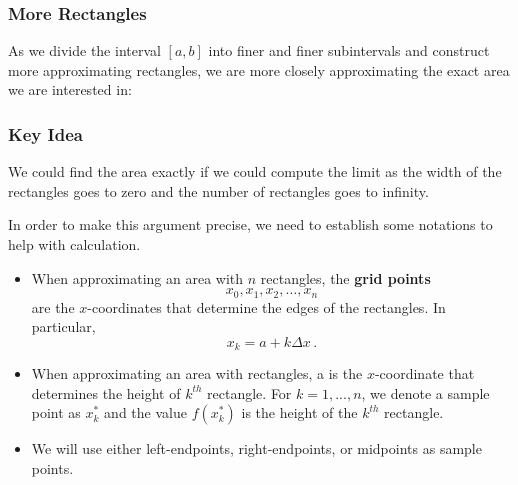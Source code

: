 \documentclass[10pt,t,handout,ignorenonframetext,aspectratio=169]{beamer}
\begin{document}
\begin{frame}
  \frametitle{More Rectangles}

  As we divide the interval $[a,b]$ into finer and finer subintervals
  and construct more approximating rectangles, we are more closely
  approximating the exact area we are interested in:

  \begin{image}
  \end{image}
\end{frame}


\begin{frame}
  \frametitle{Key Idea}
  We could find the area exactly if we could compute the
  limit as the width of the rectangles goes to zero and the number of
  rectangles goes to infinity.

  In order to make this argument precise, we need to establish some
  notations to help with calculation.

  \begin{itemize}
  \item When approximating an area with $n$ rectangles, the \textbf{grid points}
    \[
      x_0, x_1, x_2, \ldots, x_n
    \]
    are the $x$-coordinates that determine the edges of the
    rectangles. In particular,
    \[
      x_k = a + k \Delta x \,.
    \]
  \item When approximating an area with rectangles, a  is
    the $x$-coordinate that determines the height of $k^{th}$
    rectangle. For $k=1,..., n$, we denote a sample point as $x_k^*$
    and the value $f( x_k^*)$ is the height of the $k^{th}$
    rectangle.
  \item We will use either left-endpoints, right-endpoints, or midpoints as
    sample points.
  \end{itemize}
\end{frame}
\end{document}
